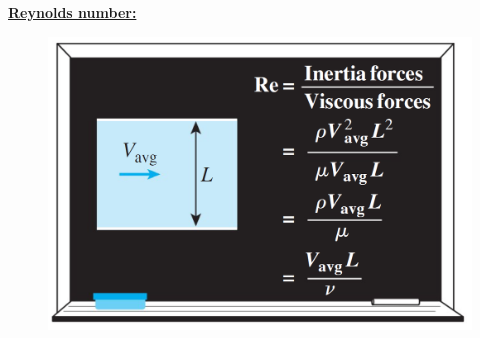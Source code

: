 \underline{\textbf{\large Reynolds number:}}
\begin{figure}[H]
    \centering
    \includegraphics[width=0.8\linewidth]{images/Renolds_Number.png}
\end{figure}
